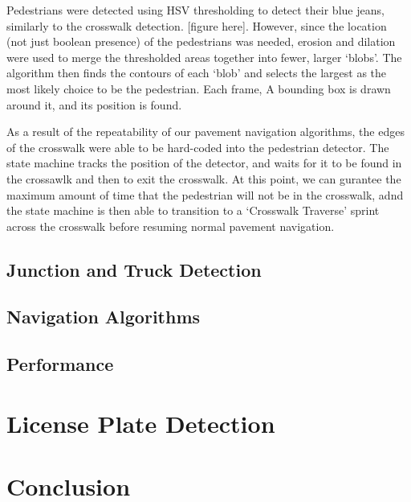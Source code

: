 \documentclass[titlepage, twocolumn]{article}
\begin{document}
            Pedestrians were detected using HSV thresholding to detect their blue jeans, similarly to the crosswalk detection. [figure here]. However, since the location (not just boolean presence) of the pedestrians was needed, erosion and dilation were used to merge the thresholded areas together into fewer, larger `blobs'. The algorithm then finds the contours of each `blob' and selects the largest as the most likely choice to be the pedestrian. Each frame, A bounding box is drawn around it, and its position is found.

            As a result of the repeatability of our pavement navigation algorithms, the edges of the crosswalk were able to be hard-coded into the pedestrian detector. The state machine tracks the position of the detector, and waits for it to be found in the crossawlk and then to exit the crosswalk. At this point, we can gurantee the maximum amount of time that the pedestrian will not be in the crosswalk, adnd the state machine is then able to transition to a `Crosswalk Traverse' sprint across the crosswalk before resuming normal pavement navigation. 
            
        \subsection{Junction and Truck Detection}
            
    \subsection{Navigation Algorithms}
    \subsection{Performance}

\section{License Plate Detection}

\section{Conclusion}
\end{document}
